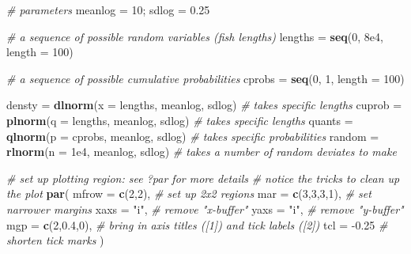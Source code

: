 \documentclass[]{book}
\newenvironment{Shaded}{\begin{snugshade}}{\end{snugshade}}
\newcommand{\CommentTok}[1]{\textcolor[rgb]{0.56,0.35,0.01}{\textit{#1}}}
\newcommand{\DataTypeTok}[1]{\textcolor[rgb]{0.13,0.29,0.53}{#1}}
\newcommand{\DecValTok}[1]{\textcolor[rgb]{0.00,0.00,0.81}{#1}}
\newcommand{\FloatTok}[1]{\textcolor[rgb]{0.00,0.00,0.81}{#1}}
\newcommand{\KeywordTok}[1]{\textcolor[rgb]{0.13,0.29,0.53}{\textbf{#1}}}
\newcommand{\NormalTok}[1]{#1}
\newcommand{\StringTok}[1]{\textcolor[rgb]{0.31,0.60,0.02}{#1}}
\begin{document}
\begin{Shaded}
\begin{Highlighting}[]
\CommentTok{# parameters}
\NormalTok{meanlog =}\StringTok{ }\DecValTok{10}\NormalTok{; sdlog =}\StringTok{ }\FloatTok{0.25}

\CommentTok{# a sequence of possible random variables (fish lengths)}
\NormalTok{lengths =}\StringTok{ }\KeywordTok{seq}\NormalTok{(}\DecValTok{0}\NormalTok{, }\FloatTok{8e4}\NormalTok{, }\DataTypeTok{length =} \DecValTok{100}\NormalTok{)}

\CommentTok{# a sequence of possible cumulative probabilities}
\NormalTok{cprobs =}\StringTok{ }\KeywordTok{seq}\NormalTok{(}\DecValTok{0}\NormalTok{, }\DecValTok{1}\NormalTok{, }\DataTypeTok{length =} \DecValTok{100}\NormalTok{)}

\NormalTok{densty =}\StringTok{ }\KeywordTok{dlnorm}\NormalTok{(}\DataTypeTok{x =}\NormalTok{ lengths, meanlog, sdlog)  }\CommentTok{# takes specific lengths}
\NormalTok{cuprob =}\StringTok{ }\KeywordTok{plnorm}\NormalTok{(}\DataTypeTok{q =}\NormalTok{ lengths, meanlog, sdlog)  }\CommentTok{# takes specific lengths}
\NormalTok{quants =}\StringTok{ }\KeywordTok{qlnorm}\NormalTok{(}\DataTypeTok{p =}\NormalTok{ cprobs, meanlog, sdlog)   }\CommentTok{# takes specific probabilities}
\NormalTok{random =}\StringTok{ }\KeywordTok{rlnorm}\NormalTok{(}\DataTypeTok{n =} \FloatTok{1e4}\NormalTok{, meanlog, sdlog)      }\CommentTok{# takes a number of random deviates to make}

\CommentTok{# set up plotting region: see ?par for more details}
\CommentTok{# notice the tricks to clean up the plot}
\KeywordTok{par}\NormalTok{(}
  \DataTypeTok{mfrow =} \KeywordTok{c}\NormalTok{(}\DecValTok{2}\NormalTok{,}\DecValTok{2}\NormalTok{),    }\CommentTok{# set up 2x2 regions}
  \DataTypeTok{mar =} \KeywordTok{c}\NormalTok{(}\DecValTok{3}\NormalTok{,}\DecValTok{3}\NormalTok{,}\DecValTok{3}\NormalTok{,}\DecValTok{1}\NormalTok{),  }\CommentTok{# set narrower margins}
  \DataTypeTok{xaxs =} \StringTok{"i"}\NormalTok{,        }\CommentTok{# remove "x-buffer"}
  \DataTypeTok{yaxs =} \StringTok{"i"}\NormalTok{,        }\CommentTok{# remove "y-buffer"}
  \DataTypeTok{mgp =} \KeywordTok{c}\NormalTok{(}\DecValTok{2}\NormalTok{,}\FloatTok{0.4}\NormalTok{,}\DecValTok{0}\NormalTok{),  }\CommentTok{# bring in axis titles ([1]) and tick labels ([2])}
  \DataTypeTok{tcl =} \FloatTok{-0.25}        \CommentTok{# shorten tick marks}
\NormalTok{)}


\end{Highlighting}
\end{Shaded}
\end{document}
